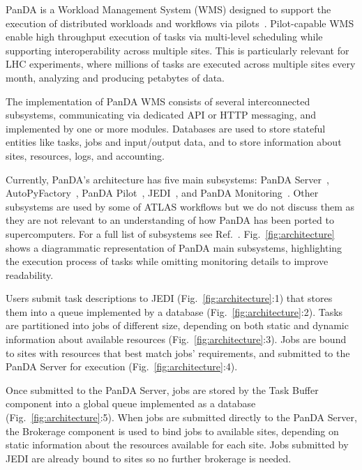 PanDA is a Workload Management System (WMS) %
designed to support the execution of distributed workloads and workflows via
pilots~\cite{turilli2017comprehensive}. Pilot-capable WMS enable high
throughput execution of tasks via multi-level scheduling while supporting
interoperability across multiple sites. This is particularly relevant for LHC
experiments, where millions of tasks are executed across multiple sites every
month, analyzing and producing petabytes of data.

The implementation of PanDA WMS consists of several interconnected
subsystems, communicating via dedicated API or HTTP messaging, and
implemented by one or more modules. Databases are used to store stateful
entities like tasks, jobs and input/output data, and to store information
about sites, resources, logs, and accounting.

Currently, PanDA's architecture has five main subsystems: PanDA
Server~\cite{maeno2011overview},
AutoPyFactory~\cite{caballero2012autopyfactory}, PanDA
Pilot~\cite{nilsson2011atlas}, JEDI~\cite{borodin2015scaling}, and PanDA
Monitoring~\cite{klimentov2011atlas}. Other subsystems are used by some of
ATLAS workflows but we do not discuss them as they are not relevant to an
understanding of how PanDA has been ported to supercomputers. For a full list
of subsystems see Ref.~\cite{panda-wiki_url}. Fig.~\ref{fig:architecture}
shows a diagrammatic representation of PanDA main subsystems, highlighting
the execution process of tasks while omitting monitoring details to improve
readability.

Users submit task descriptions to JEDI (Fig.~\ref{fig:architecture}:1) that
stores them into a queue implemented by a database
(Fig.~\ref{fig:architecture}:2). Tasks are partitioned into jobs of different
size, depending on both static and dynamic information about available
resources (Fig.~\ref{fig:architecture}:3). Jobs are bound to sites with
resources that best match jobs' requirements, and submitted to the PanDA
Server for execution (Fig.~\ref{fig:architecture}:4).

Once submitted to the PanDA Server, jobs are stored by the Task Buffer
component into a global queue implemented as a database
(Fig.~\ref{fig:architecture}:5). When jobs are submitted directly to the
PanDA Server, the Brokerage component is used to bind jobs to available
sites, depending on static information about the resources available for each
site. Jobs submitted by JEDI are already bound to sites so no further
brokerage is needed.

